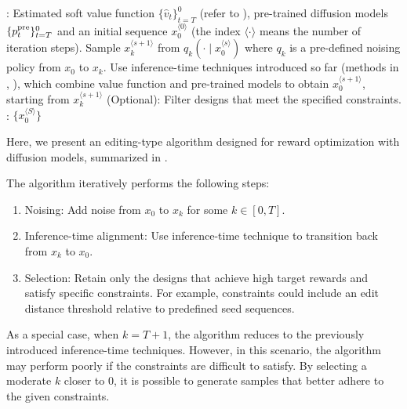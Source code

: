 \begin{algorithm}[!th]
\caption{Iterative Refinement for Reward Optimization  in Diffusion Models}\label{alg:decoding4}
\begin{algorithmic}[1]
     : Estimated soft value function $\{\hat v_t\}_{t=T}^0$ (refer to ), pre-trained diffusion models $\{p^{\mathrm{pre}}_t\}_{t=T}^0$ and an initial sequence $x^{\langle 0 \rangle }_0$ (the index $\langle \cdot \rangle $ means the number of iteration steps). 
       \STATE  Sample $x^{\langle s+1 \rangle }_k$ from  $q_k(\cdot \mid x^{\langle s \rangle }_0)$ where $q_k$ is a pre-defined noising policy from $x_0$ to $x_k$. 
        \STATE Use inference-time techniques introduced so far (methods in , ), which combine value function and pre-trained models to obtain $x^{\langle s+1 \rangle }_0$, starting from $x^{\langle s+1 \rangle }_k$
    \STATE (Optional): Filter designs that meet the specified constraints.
     \ENDFOR
  : $\{ x^{\langle S \rangle}_0\}$
\end{algorithmic}
\end{algorithm}

Here, we present an editing-type algorithm designed for reward optimization with diffusion models, summarized in .

The algorithm iteratively performs the following steps:
\begin{enumerate}
    \item Noising: Add noise from $x_0$ to $x_k$ for some $k \in [0,T]$. 
    \item Inference-time alignment: Use inference-time technique to transition back from $x_k$ to $x_0$. 
    \item Selection: Retain only the designs that achieve high target rewards and satisfy specific constraints. For example, constraints could include an edit distance threshold relative to predefined seed sequences.
\end{enumerate}

As a special case, when $k=T+1$, the algorithm reduces to the previously introduced inference-time techniques. However, in this scenario, the algorithm may perform poorly if the constraints are difficult to satisfy. By selecting a moderate $k$ closer to $0$, it is possible to generate samples that better adhere to the given constraints.

